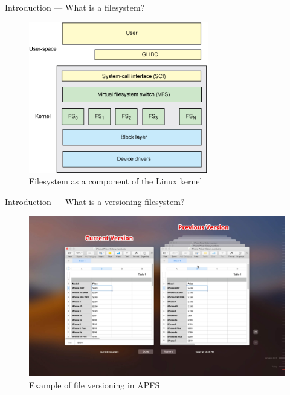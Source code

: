 \documentclass[xcolor=table]{beamer}
\begin{document}
	\begin{frame}{Introduction --- What is a filesystem?}
		\begin{figure}
			\centering
			\includegraphics[width=0.7\textwidth]{media/fs2.png}
			\caption{Filesystem as a component of the Linux kernel }
		\end{figure}	
	\end{frame}

	\begin{frame}{Introduction --- What is a versioning filesystem?}
		\begin{figure}
			\centering
			\includegraphics[width=\textwidth]{media/versioning.jpg}
			\caption{Example of file versioning in APFS }
		\end{figure}	
	\end{frame}
\end{document}
